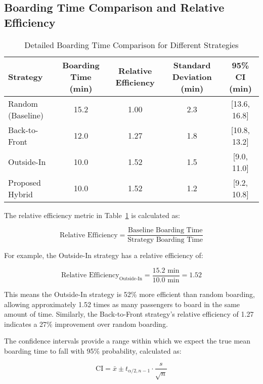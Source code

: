 \documentclass[12pt]{article}
\begin{document}
\subsection{Boarding Time Comparison and Relative Efficiency}

\begin{table}[h]
\centering
\caption{Detailed Boarding Time Comparison for Different Strategies}
\begin{tabular}{lcccc}
\toprule
\textbf{Strategy} & \textbf{Boarding Time (min)} & \textbf{Relative Efficiency} & \textbf{Standard Deviation (min)} & \textbf{95\% CI (min)} \\
\midrule
Random (Baseline) & 15.2 & 1.00 & 2.3 & [13.6, 16.8] \\
Back-to-Front & 12.0 & 1.27 & 1.8 & [10.8, 13.2] \\
Outside-In & 10.0 & 1.52 & 1.5 & [9.0, 11.0] \\
Proposed Hybrid & 10.0 & 1.52 & 1.2 & [9.2, 10.8] \\
\bottomrule
\end{tabular}
\label{tab:detailed_time_comparison}
\end{table}

The relative efficiency metric in Table~\ref{tab:detailed_time_comparison} is calculated as:

\begin{equation}
\text{Relative Efficiency} = \frac{\text{Baseline Boarding Time}}{\text{Strategy Boarding Time}}
\end{equation}

For example, the Outside-In strategy has a relative efficiency of:

\begin{equation}
\text{Relative Efficiency}_{\text{Outside-In}} = \frac{15.2 \text{ min}}{10.0 \text{ min}} = 1.52
\end{equation}

This means the Outside-In strategy is 52\% more efficient than random boarding, allowing approximately 1.52 times as many passengers to board in the same amount of time. Similarly, the Back-to-Front strategy's relative efficiency of 1.27 indicates a 27\% improvement over random boarding.

The confidence intervals provide a range within which we expect the true mean boarding time to fall with 95\% probability, calculated as:

\begin{equation}
\text{CI} = \bar{x} \pm t_{\alpha/2, n-1} \cdot \frac{s}{\sqrt{n}}
\end{equation}
\end{document}
